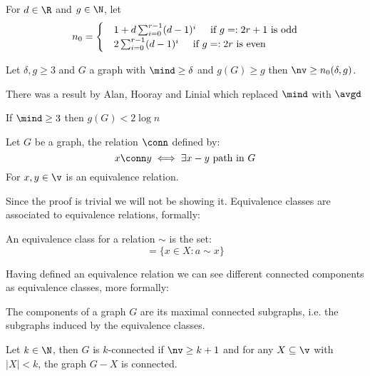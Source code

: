 \begin{customproposition}{1.8}
    \label{proposition:1.8}
    For $d \in \R$ and $g \in \N$, let
    \begin{equation*}
        n_0 =
        \begin{cases}
            &1 + d \sum_{i = 0}^{r - 1}(d - 1)^i \hspace{5mm} \text{if $g =: 2r + 1$ is odd}\\
            &2\sum_{i = 0}^{r - 1}(d - 1)^i \hspace{5mm} \text{if $g =: 2r$ is even}
        \end{cases}
    \end{equation*}
\end{customproposition}
Let $\delta, g \geq 3$ and $G$ a graph with $\mind \geq \delta$ and $g(G) \geq g$ then $\nv \geq n_0(\delta, g)$.\\
\begin{coolfact}
    There was a result by Alan, Hooray and Linial which replaced $\mind$ with $\avgd$
\end{coolfact}
\begin{customcorollary}{1.9}
    \label{corollary:1.9}
    If $\mind \geq 3$ then $g(G) < 2\log{n}$
\end{customcorollary}
\begin{customlemma}{1.11}
    \label{lemma:1.11}
    Let $G$ be a graph, the relation $\conn$ defined by:
    \begin{equation*}
        x \conn y \iff \exists x-y \text{ path in } G
    \end{equation*}
    For $x, y \in \v$ is an equivalence relation.
\end{customlemma}
Since the proof is trivial we will not be showing it. Equivalence classes are associated to equivalence relations, formally:
\begin{definition}
    An equivalence class for a relation $\sim$ is the set:
    \begin{equation*}
        [a] = \{x \in X: a \sim x\}
    \end{equation*}
\end{definition}
Having defined an equivalence relation we can see different connected components as equivalence classes, more formally:
\begin{definition}[Component]
    The components of a graph $G$ are its maximal connected subgraphs, i.e. the subgraphs induced by the equivalence classes.
\end{definition}
\begin{definition}[$k$-connectivity]
    Let $k \in \N$, then $G$ is $k$-connected if $\nv \geq k + 1$ and for any $X \subseteq \v$ with $|X| < k$, the graph $G - X$ is connected.
\end{definition}
